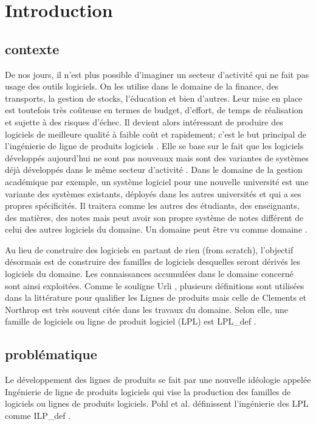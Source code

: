 \chapter{Introduction}

\section*{contexte}
De nos jours, il n'est plus possible d'imaginer un secteur d'activité qui ne fait pas usage des outils logiciels. On les utilise  dans le domaine de la finance, des transports, la gestion de stocks, l'éducation et bien d'autres. Leur mise en place est toutefois très coûteuse en termes de budget, d’effort, de temps de réalisation et sujette à des risques d’échec. Il devient alors intéressant de produire des logiciels de meilleure qualité à faible coût et rapidement; c'est le but principal de l'ingénierie de ligne de produits logiciels \cite{Klaus2005}.  Elle se base sur le fait que les logiciels développés aujourd'hui ne sont pas nouveaux mais sont des variantes de systèmes déjà développés dans le même secteur d’activité \cite{Fouda2009}. Dans le domaine de la gestion académique par exemple, un système logiciel pour une nouvelle université est une variante des systèmes existants, déployés dans les autres universités et qui a ses propres spécificités. Il traitera comme les autres des étudiants, des enseignants, des matières, des notes mais peut avoir son propre système de notes différent de celui des autres logiciels du domaine. Un domaine peut être vu comme \glsdesc{domaine} \cite{Klaus2005}.

Au lieu de construire des logiciels en partant de rien (from scratch), l'objectif désormais est de construire des familles de logiciels desquelles seront dérivés les logiciels du domaine. Les connaissances accumulées dans le domaine concerné sont ainsi exploitées. 
Comme le souligne Urli \cite{Urli2015}, plusieurs définitions sont utilisées dans la littérature pour qualifier les Lignes de produits mais celle de Clements et Northrop est très souvent citée dans les travaux du domaine. Selon elle, une famille de logiciels ou ligne de produit logiciel (LPL) est \glsdesc{LPL_def} \cite{Clements2002}. 

\section*{problématique} 
Le développement des lignes de produits se fait par une nouvelle idéologie appelée Ingénierie de ligne de produits logiciels qui vise la production des familles de logiciels ou lignes de produits logiciels. Pohl et al. définissent l’ingénierie des LPL comme \glsdesc{ILP_def} \cite{Klaus2005}. 


